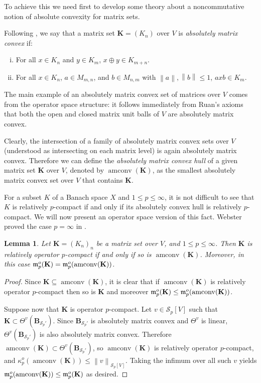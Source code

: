 \documentclass[11pt]{amsart}
\DeclareMathOperator{\amconv}{amconv}
\newcommand{\n}[1]{ \left\|#1\right\| }
\newtheorem{lemma}[theorem]{Lemma}
\numberwithin{equation}{section}
\begin{document}
To achieve this we need first to develop some theory about a noncommutative notion of absolute convexity for matrix sets.


Following \cite{Effros-Webster}, we say that a matrix set $\mathbf{K} = (K_n)$ over $V$ is \emph{absolutely matrix convex} if:
\begin{enumerate}[(i)]
	\item For all $x \in K_n$ and $y \in K_m$, $x \oplus y \in K_{m+n}$.
	\item For all $x \in K_n$, $a \in M_{m,n}$, and $b \in M_{n,m}$ with $\n{a}, \n{b} \le 1$,
	$a x b \in K_m$.
\end{enumerate}

The main example of an absolutely matrix convex set of matrices over $V$ comes from the operator space structure: it follows immediately from Ruan's axioms that both the open and closed matrix unit balls of $V$ are  absolutely matrix convex.

Clearly, the intersection of a family of absolutely matrix convex sets over $V$ (understood as intersecting on each matrix level) is again absolutely matrix convex. Therefore we can define the \emph{absolutely matrix convex hull} of a given matrix set $\mathbf{K}$ over $V$, denoted by $\amconv(\mathbf{K})$,
as the smallest absolutely matrix convex   set over $V$ that contains $\mathbf{K}$.

For a subset $K$ of a Banach space $X$ and $1 \le p \le \infty$, it is not difficult to see that $K$ is relatively $p$-compact if and only if its absolutely convex hull is relatively $p$-compact.
We will now present an operator space version of this fact. Webster proved the case $p=\infty$ in \cite[p. 8]{webster1998matrix}.


\begin{lemma}\label{lemma-amconv-preserves-p-compactness}
Let $\mathbf{K}=(K_n)_n$ be a matrix set over $V$, and $1\le p \le \infty$. Then $\mathbf{K}$ is relatively operator $p$-compact if and only if so is $\amconv(\mathbf{K})$. Moreover, in this case $\frak m_p^o(\mathbf{K}) =\frak m_p^o(\amconv(\mathbf{K}))$.
\end{lemma}

\begin{proof}
Since $\mathbf{K} \subseteq \amconv(\mathbf{K})$, it is clear that if $\amconv(\mathbf{K})$ is relatively operator $p$-compact then so is $\mathbf{K}$ and moreover $\frak m_p^o(\mathbf{K}) \le \frak m_p^o(\amconv(\mathbf{K}))$.

Suppose now that $\mathbf{K}$ is operator $p$-compact. Let $v \in \mathcal{S}_p[V]$ such that $\mathbf{K}\subset \Theta^v(\mathbf{B}_{\mathcal{S}_p'})$. 
Since $\mathbf{B}_{\mathcal{S}_p'}$ is absolutely matrix convex and $\Theta^v$ is linear, $\Theta^v(\mathbf{B}_{\mathcal{S}_p'})$ is also absolutely matrix convex.
Therefore $\amconv(\mathbf{K})\subset \Theta^v(\mathbf{B}_{\mathcal{S}_p'})$, so $\amconv(\mathbf{K})$ is relatively operator $p$-compact, and $\kappa_p^o(\amconv(\mathbf{K})) \le \n{v}_{\mathcal{S}_p[V]}$. Taking the infimum over all such $v$ yields $\frak m_p^o(\amconv(\mathbf{K})) \le \frak m_p^o(\mathbf{K})$ as desired.
\end{proof}
\end{document}

